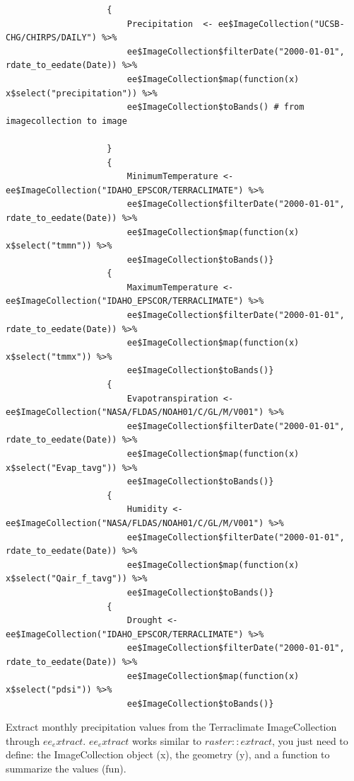 \documentclass[12pt,a4paper]{book}
\begin{document}
			\begin{shaded}
				\begin{verbatim}
					{
						Precipitation  <- ee$ImageCollection("UCSB-CHG/CHIRPS/DAILY") %>%
						ee$ImageCollection$filterDate("2000-01-01", rdate_to_eedate(Date)) %>%
						ee$ImageCollection$map(function(x) x$select("precipitation")) %>% 
						ee$ImageCollection$toBands() # from imagecollection to image
						
					}
					{
						MinimumTemperature <- ee$ImageCollection("IDAHO_EPSCOR/TERRACLIMATE") %>%
						ee$ImageCollection$filterDate("2000-01-01", rdate_to_eedate(Date)) %>%
						ee$ImageCollection$map(function(x) x$select("tmmn")) %>% 
						ee$ImageCollection$toBands()}
					{
						MaximumTemperature <- ee$ImageCollection("IDAHO_EPSCOR/TERRACLIMATE") %>%
						ee$ImageCollection$filterDate("2000-01-01", rdate_to_eedate(Date)) %>%
						ee$ImageCollection$map(function(x) x$select("tmmx")) %>% 
						ee$ImageCollection$toBands()}
					{
						Evapotranspiration <- ee$ImageCollection("NASA/FLDAS/NOAH01/C/GL/M/V001") %>%
						ee$ImageCollection$filterDate("2000-01-01", rdate_to_eedate(Date)) %>%
						ee$ImageCollection$map(function(x) x$select("Evap_tavg")) %>% 
						ee$ImageCollection$toBands()}
					{
						Humidity <- ee$ImageCollection("NASA/FLDAS/NOAH01/C/GL/M/V001") %>%
						ee$ImageCollection$filterDate("2000-01-01", rdate_to_eedate(Date)) %>%
						ee$ImageCollection$map(function(x) x$select("Qair_f_tavg")) %>% 
						ee$ImageCollection$toBands()}
					{
						Drought <- ee$ImageCollection("IDAHO_EPSCOR/TERRACLIMATE") %>%
						ee$ImageCollection$filterDate("2000-01-01", rdate_to_eedate(Date)) %>%
						ee$ImageCollection$map(function(x) x$select("pdsi")) %>% 
						ee$ImageCollection$toBands()}
				\end{verbatim}
			\end{shaded}			
			Extract monthly precipitation values from the Terraclimate ImageCollection
			 through $ ee_extract $. $ ee_extract $ works similar to $ raster::extract $, 
			 you just need to define: the ImageCollection object (x), the geometry (y),
			 and a function to summarize the values (fun).	  
\end{document}
